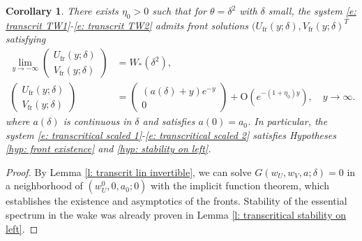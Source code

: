 \documentclass[11pt]{article}
\newtheorem{corollary}[prop]{Corollary}
\numberwithin{equation}{section}
\numberwithin{prop}{section}
\begin{document}
\begin{corollary}\label{c: transcrit existence}
	There exists $\eta_0 > 0$ such that for $\theta = \delta^2$ with $\delta$ small, the system \eqref{e: transcrit TW1}-\eqref{e: transcrit TW2} admits front solutions $(U_\mathrm{fr}(y; \delta), V_\mathrm{fr}(y; \delta)^T$ satisfying
	\begin{align}
		\lim_{y \to -\infty} \begin{pmatrix} U_\mathrm{fr}(y; \delta) \\ V_\mathrm{fr}(y; \delta) \end{pmatrix} &= W_*(\delta^2), \\
		\begin{pmatrix} U_\mathrm{fr}(y; \delta) \\ V_\mathrm{fr}(y; \delta) \end{pmatrix} &= \begin{pmatrix} (a(\delta)+y)e^{-y} \\ 0 \end{pmatrix} + \mathrm{O}(e^{-(1+\eta_0) y}), \quad y \to \infty. 
	\end{align}
	where $a(\delta)$ is continuous in $\delta$ and satisfies $a(0) = a_0$. In particular, the system \eqref{e: transcritical scaled 1}-\eqref{e: transcritical scaled 2} satisfies Hypotheses \ref{hyp: front existence} and \ref{hyp: stability on left}. 
\end{corollary}
\begin{proof}
	By Lemma \ref{l: transcrit lin invertible}, we can solve $G(w_U, w_V, a; \delta) = 0$ in a neighborhood of $(w_U^0, 0, a_0; 0)$ with the implicit function theorem, which establishes the existence and asymptotics of the fronts. Stability of the essential spectrum in the wake was already proven in Lemma \ref{l: transcritical stability on left}. 
\end{proof}
\end{document}
